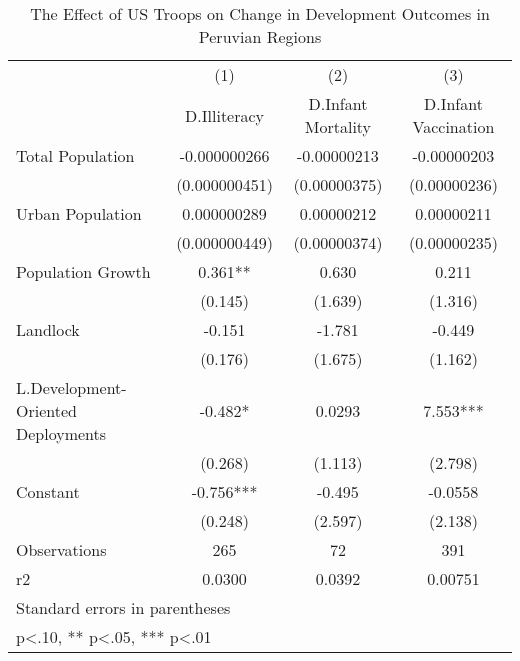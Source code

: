 \begin{table}[htbp]\centering
\def\sym#1{\ifmmode^{#1}\else\(^{#1}\)\fi}
\caption{The Effect of US Troops on Change in Development Outcomes in Peruvian Regions}
\begin{tabular}{l*{3}{c}}
\hline\hline
                    &\multicolumn{1}{c}{(1)}&\multicolumn{1}{c}{(2)}&\multicolumn{1}{c}{(3)}\\
                    &\multicolumn{1}{c}{D.Illiteracy}&\multicolumn{1}{c}{D.Infant Mortality}&\multicolumn{1}{c}{D.Infant Vaccination}\\
\hline
Total Population    &-0.000000266   & -0.00000213   & -0.00000203   \\
                    &(0.000000451)   &(0.00000375)   &(0.00000236)   \\
[1em]
Urban Population    & 0.000000289   &  0.00000212   &  0.00000211   \\
                    &(0.000000449)   &(0.00000374)   &(0.00000235)   \\
[1em]
Population Growth   &       0.361** &       0.630   &       0.211   \\
                    &     (0.145)   &     (1.639)   &     (1.316)   \\
[1em]
Landlock            &      -0.151   &      -1.781   &      -0.449   \\
                    &     (0.176)   &     (1.675)   &     (1.162)   \\
[1em]
L.Development-Oriented Deployments&      -0.482*  &      0.0293   &       7.553***\\
                    &     (0.268)   &     (1.113)   &     (2.798)   \\
[1em]
Constant            &      -0.756***&      -0.495   &     -0.0558   \\
                    &     (0.248)   &     (2.597)   &     (2.138)   \\
\hline
Observations        &         265   &          72   &         391   \\
r2                  &      0.0300   &      0.0392   &     0.00751   \\
\hline\hline
\multicolumn{4}{l}{\footnotesize Standard errors in parentheses}\\
\multicolumn{4}{l}{\footnotesize * p<.10, ** p<.05, *** p<.01}\\
\end{tabular}
\end{table}
